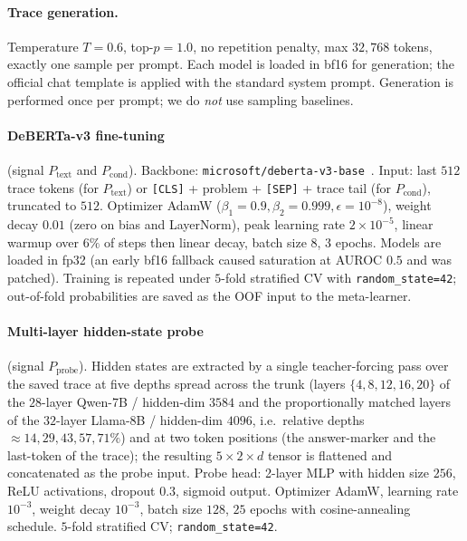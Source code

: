 \documentclass{article}
\begin{document}
\paragraph{Trace generation.} Temperature $T = 0.6$, top-$p = 1.0$, no
repetition penalty, max $32{,}768$ tokens, exactly one sample per prompt.
Each model is loaded in bf16 for generation; the official chat template is
applied with the standard system prompt. Generation is performed once per
prompt; we do \emph{not} use sampling baselines.

\paragraph{DeBERTa-v3 fine-tuning} (signal $P_{\text{text}}$ and
$P_{\text{cond}}$). Backbone: \texttt{microsoft/deberta-v3-base}~\cite{he2021deberta}.
Input: last $512$ trace tokens (for $P_{\text{text}}$) or
\texttt{[CLS]} + problem + \texttt{[SEP]} + trace tail (for
$P_{\text{cond}}$), truncated to $512$. Optimizer AdamW
($\beta_1\!=\!0.9, \beta_2\!=\!0.999, \epsilon\!=\!10^{-8}$),
weight decay $0.01$ (zero on bias and LayerNorm), peak learning rate
$2 \times 10^{-5}$, linear warmup over $6\%$ of steps then linear decay,
batch size $8$, $3$ epochs. Models are loaded in fp32 (an early bf16
fallback caused saturation at AUROC $0.5$ and was patched). Training is
repeated under $5$-fold stratified CV with \texttt{random\_state=42};
out-of-fold probabilities are saved as the OOF input to the meta-learner.

\paragraph{Multi-layer hidden-state probe} (signal $P_{\text{probe}}$).
Hidden states are extracted by a single teacher-forcing pass over the
saved trace at five depths spread across the trunk (layers
$\{4, 8, 12, 16, 20\}$ of the $28$-layer Qwen-7B / hidden-dim $3584$ and
the proportionally matched layers of the $32$-layer Llama-8B / hidden-dim
$4096$, i.e.\ relative depths $\approx 14, 29, 43, 57, 71\%$) and at two
token positions (the answer-marker and the last-token of the trace);
the resulting $5 \times 2 \times d$ tensor is flattened and concatenated as
the probe input. Probe head: 2-layer MLP with hidden size $256$, ReLU
activations, dropout $0.3$, sigmoid output. Optimizer AdamW, learning rate
$10^{-3}$, weight decay $10^{-3}$, batch size $128$, $25$ epochs with
cosine-annealing schedule. $5$-fold stratified CV;
\texttt{random\_state=42}.
\end{document}
